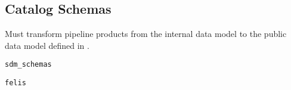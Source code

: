 \subsection{Catalog Schemas}
\label{sec:schemas}

Must transform pipeline products from the internal data model to the public data model defined in \citet{LSE-163}.

\texttt{sdm\_schemas}

\texttt{felis}
\citep{2024arXiv241209721M}
